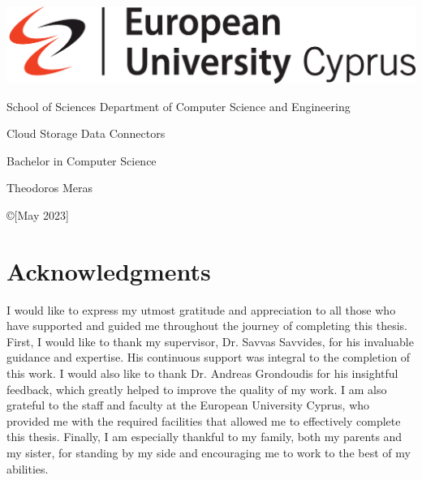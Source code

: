 \documentclass[12pt,a4paper]{report}
\begin{document}
    \thispagestyle{empty}
    {

    \noindent\includegraphics[scale=0.32]{images/euc}


        \begin{center}
            School of Sciences \textbar \; Department of Computer Science and Engineering
        \end{center}

        \vspace{1.5cm}
        \begin{center}
            \Huge  Cloud Storage Data Connectors
        \end{center}


        \vspace{0.2cm}

        \vspace{1.5cm}
        \begin{center}
            \LARGE Bachelor in Computer Science
        \end{center}


        \vspace{1.5cm}
        \begin{center}
            \Large Theodoros Meras
        \end{center}
        \vspace{1.5cm}

        \noindent
        \begin{center}
            \copyright  [May 2023]
        \end{center}
        \newpage
        \thispagestyle{empty}

    }%

    \section*{Acknowledgments}
	I would like to express my utmost gratitude and appreciation to all those who have supported and guided me throughout the journey of completing this thesis. First, I would like to thank my supervisor, Dr. Savvas Savvides, for his invaluable guidance and expertise. His continuous support was integral to the completion of this work. I would also like to thank Dr. Andreas Grondoudis for his insightful feedback, which greatly helped to improve the quality of my work. I am also grateful to the staff and faculty at the European University Cyprus, who provided me with the required facilities that allowed me to effectively complete this thesis. Finally, I am especially thankful to my family, both my parents and my sister, for standing by my side and encouraging me to work to the best of my abilities. 
\end{document}
